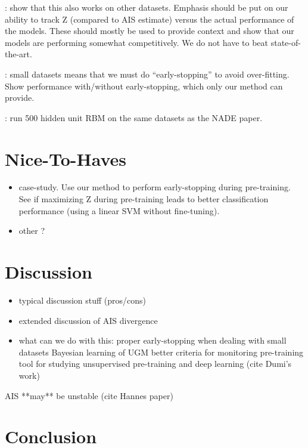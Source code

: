 \documentclass[runningheads,a4paper]{llncs}
\begin{document}
: show that this also works on other datasets. Emphasis should be put
on our ability to track Z (compared to AIS estimate) versus the actual
performance of the models. These should mostly be used to provide context and
show that our models are performing somewhat competitively. We do not have to
beat state-of-the-art.

: small datasets means that we must do
``early-stopping'' to avoid over-fitting. Show performance with/without
early-stopping, which only our method can provide.

: run 500 hidden unit RBM on the same datasets as the NADE paper. 

\section{Nice-To-Haves}

\begin{itemize}
    \item case-study. Use our method to perform early-stopping during
        pre-training. See if maximizing Z during pre-training leads to better
        classification performance (using a linear SVM without fine-tuning).
    \item other ?
\end{itemize}

\section{Discussion}

\begin{itemize}
    \item typical discussion stuff (pros/cons)
    \item extended discussion of AIS divergence
    \item what can we do with this:
        \subitem proper early-stopping when dealing with small datasets
        \subitem Bayesian learning of UGM
        \subitem better criteria for monitoring pre-training
        \subitem tool for studying unsupervised pre-training and deep learning
        (cite Dumi's work)
\end{itemize}

AIS **may** be unstable (cite Hannes paper)

\section{Conclusion}
\end{document}

